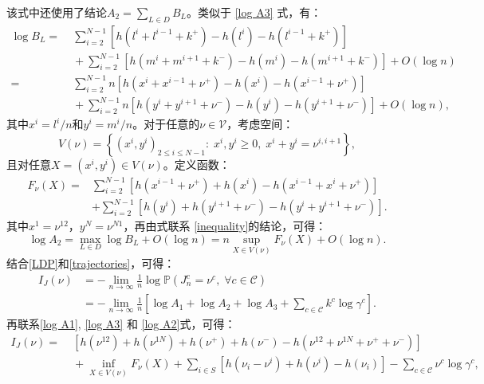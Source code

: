 该式中还使用了结论$A_2 = \sum_{L\in D}B_L$。类似于 \ref{log A3} 式，有：
\begin{equation}\label{log BL}
    \begin{split}
    \log B_L =&\;\sum_{i=2}^{N-1}[h(l^i+l^{i-1}+k^+)-h(l^i)-h(l^{i-1}+k^+)]\\
    &\;+\sum_{i=2}^{N-1}[h(m^i+m^{i+1}+k^-)-h(m^i)-h(m^{i+1}+k^-)]+O(\log n)\\
    =&\;\sum_{i=2}^{N-1}n[h(x^i+x^{i-1}+\nu^+)-h(x^i)-h(x^{i-1}+\nu^+)]\\
    &\;+\sum_{i=2}^{N-1}n[h(y^i+y^{i+1}+\nu^-)-h(y^i)-h(y^{i+1}+\nu^-)]+O(\log n),
    \end{split}
\end{equation}
其中$x^i = l^i/n$和$y^i = m^i/n$。对于任意的$\nu \in \mathcal{V}$，考虑空间：
\begin{equation*}
    V(\nu) = \left\{\left(x^{i},y^{i}\right)_{2\le i\le N-1}:\;x^i,y^i\geq0,\;x^{i}+y^{i}=\nu^{i,i+1}\right\},
\end{equation*}
且对任意$X = (x^i, y^i) \in V(\nu)$。定义函数：
\begin{equation}\label{formula:F}
    \begin{split}
    F_{\nu}(X)
    =&\sum_{i=2}^{N-1}\left[ h\left(x^{i-1}+\nu^+\right) + h\left(x^{i}\right) - h\left(x^{i-1}+x^{i}+\nu^+\right) \right] \\
    &+ \sum_{i=2}^{N-1} \left[h\left(y^{i}\right) + h\left(y^{i+1} +\nu^-\right)-h\left(y^{i} +y^{i+1} +\nu^-\right)\right].
    \end{split}
\end{equation}
其中$x^1=\nu^{12}$，$y^N=\nu^{N1}$，再由式联系 \ref{inequality}的结论，可得：
\begin{equation}\label{log A2}
    \log A_2 = \max_{L\in D}\log B_L+O(\log n)
    = n\sup_{X\in V(\nu)}F_{\nu}(X)+O(\log n).
\end{equation}
结合\eqref{LDP}和\eqref{trajectories}，可得：
\begin{equation*}
    \begin{split}
    I_J(\nu) &= -\lim_{n\to\infty}\frac{1}{n}\log\mathbb{P}\left(J^c_n=\nu^c,\;\forall c\in\mathcal{C}\right)\\
    &= -\lim_{n\to\infty}\frac{1}{n}\left[\log A_1+\log A_2+\log A_3+\sum_{c\in\mathcal{C}}k^c\log\gamma^c\right].
    \end{split}
\end{equation*}
再联系\eqref{log A1}, \eqref{log A3} 和 \eqref{log A2}式，可得：
\begin{equation}\label{ratefunction}
    \begin{split}
    I_J(\nu) =&\; \left[h\left(\nu^{12}\right)+h\left(\nu^{1N}\right)
    +h\left(\nu^+\right)+h\left(\nu^-\right)-h\left(\nu^{12}+\nu^{1N}+\nu^++\nu^-\right)\right] \\
    &\;+\inf_{X\in V(\nu)}F_{\nu}(X)+\sum_{i\in S}\left[ h\left(\nu_i-\nu^i\right)+h\left(\nu^i\right)
    -h\left(\nu_i\right)\right]-\sum_{c\in\mathcal{C}}\nu^c\log\gamma^c,
    \end{split}
\end{equation}
